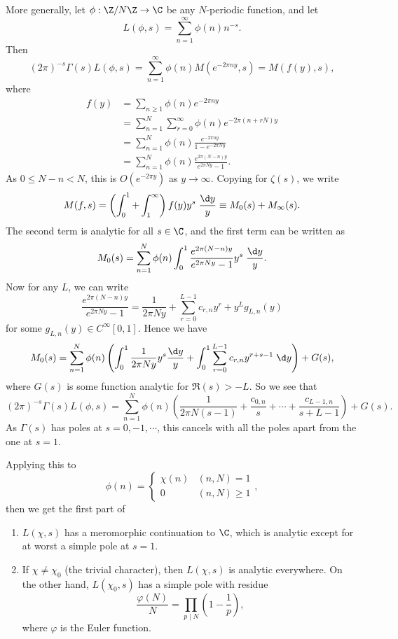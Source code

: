 \documentclass[a4paper]{article}
\begin{document}
More generally, let $\phi: \Z/N\Z \to \C$ be any $N$-periodic function, and let
\[
  L(\phi, s) = \sum_{n = 1}^\infty \phi(n) n^{-s}.
\]
Then
\[
  (2\pi)^{-s} \Gamma(s) L(\phi,s) = \sum_{n = 1}^\infty \phi(n) M(e^{-2\pi ny}, s) = M(f(y), s),
\]
where
\begin{align*}
  f(y) &= \sum_{n \geq 1} \phi(n) e^{-2\pi n y} \\
  &= \sum_{n = 1}^N \sum_{r = 0}^\infty \phi(n) e^{-2\pi (n + rN) y} \\
  &= \sum_{n = 1}^N \phi(n) \frac{e^{-2\pi n y}}{1 - e^{-2 \pi N y}} \\
  &= \sum_{n = 1}^N \phi(n) \frac{e^{2\pi (N - n) y}}{e^{2\pi Ny} - 1}.
\end{align*}
As $0 \leq N - n < N$, this is $O(e^{-2\pi y})$ as $y \to \infty$. Copying for $\zeta(s)$, we write
\[
  M(f, s) = \left(\int_0^1 + \int_1^\infty\right)f(y) y^s\; \frac{\d y}{y} \equiv M_0(s) + M_\infty(s).
\]
The second term is analytic for all $s \in \C$, and the first term can be written as
\[
  M_0(s) = \sum_{n = 1}^N \phi(n) \int_0^1 \frac{e^{2\pi (N -n) y}}{ e^{2\pi Ny} - 1} y^s\;\frac{\d y}{y}.
\]
Now for any $L$, we can write
\[
  \frac{e^{2\pi (N - n) y}}{e^{2\pi Ny} - 1} = \frac{1}{2 \pi N y} + \sum_{r = 0}^{L - 1} c_{r, n} y^r + y^L g_{L, n}(y)
\]
for some $g_{L, n}(y) \in C^\infty[0, 1]$. Hence we have
\[
  M_0(s) = \sum_{n = 1}^N \phi(n) \left(\int_0^1 \frac{1}{2\pi N y} y^s \frac{\d y}{y} + \int_0^1 \sum_{r = 0}^{L - 1} c_{r, n} y^{r + s - 1} \;\d y\right) + G(s),
\]
where $G(s)$ is some function analytic for $\Re(s) > -L$. So we see that
\[
  (2\pi)^{-s} \Gamma(s) L(\phi, s) = \sum_{n = 1}^N \phi(n) \left(\frac{1}{2\pi N(s - 1)} + \frac{c_{0, n}}{s} + \cdots + \frac{c_{L - 1, n}}{s + L - 1}\right) + G(s).
\]
As $\Gamma(s)$ has poles at $s = 0, -1, \cdots$, this cancels with all the poles apart from the one at $s = 1$.

Applying this to
\[
  \phi(n) =
  \begin{cases}
    \chi(n) & (n, N) = 1\\
    0 & (n, N) \geq 1
  \end{cases},
\]
then we get the first part of
\begin{thm}\leavevmode
  \begin{enumerate}
    \item $L(\chi, s)$ has a meromorphic continuation to $\C$, which is analytic except for at worst a simple pole at $s = 1$.
    \item If $\chi \not= \chi_0$ (the trivial character), then $L(\chi, s)$ is analytic everywhere. On the other hand, $L(\chi_0, s)$ has a simple pole with residue
      \[
        \frac{\varphi(N)}{N} = \prod_{p \mid N} \left(1 - \frac{1}{p}\right),
      \]
      where $\varphi$ is the Euler function.
  \end{enumerate}
\end{thm}
\end{document}
